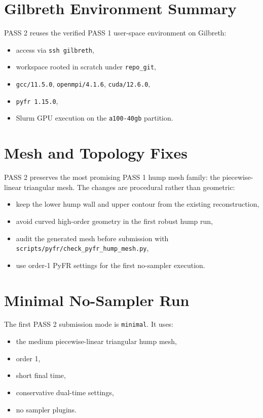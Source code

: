\documentclass[11pt]{article}
\begin{document}
\section{Gilbreth Environment Summary}
PASS 2 reuses the verified PASS 1 user-space environment on Gilbreth:
\begin{itemize}
  \item access via \texttt{ssh gilbreth},
  \item workspace rooted in scratch under \texttt{repo\_git},
  \item \texttt{gcc/11.5.0}, \texttt{openmpi/4.1.6}, \texttt{cuda/12.6.0},
  \item \texttt{pyfr 1.15.0},
  \item Slurm GPU execution on the \texttt{a100-40gb} partition.
\end{itemize}

\section{Mesh and Topology Fixes}
PASS 2 preserves the most promising PASS 1 hump mesh family: the piecewise-linear triangular mesh. The changes are procedural rather than geometric:
\begin{itemize}
  \item keep the lower hump wall and upper contour from the existing reconstruction,
  \item avoid curved high-order geometry in the first robust hump run,
  \item audit the generated mesh before submission with \texttt{scripts/pyfr/check\_pyfr\_hump\_mesh.py},
  \item use order-1 PyFR settings for the first no-sampler execution.
\end{itemize}

\section{Minimal No-Sampler Run}
The first PASS 2 submission mode is \texttt{minimal}. It uses:
\begin{itemize}
  \item the medium piecewise-linear triangular hump mesh,
  \item order 1,
  \item short final time,
  \item conservative dual-time settings,
  \item no sampler plugins.
\end{itemize}
\end{document}
